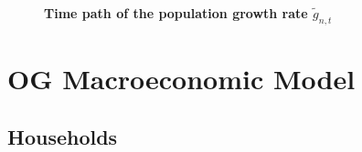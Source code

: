 \documentclass[letterpaper,12pt]{article}
\theoremstyle{definition}
\begin{document}
    \begin{figure}[htbp]\centering \captionsetup{width=4.0in}
      \caption{\label{FigGrowthPath}\textbf{Time path of the population growth rate $\tilde{g}_{n,t}$}}
    \end{figure}


\section{OG Macroeconomic Model}\label{SecOGmodel}


  \subsection{Households}\label{SecOGmodelHH}
\end{document}
